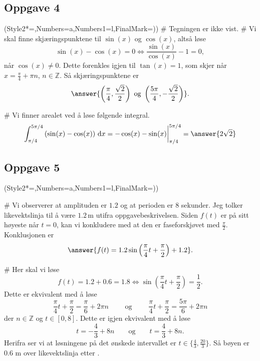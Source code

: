 \subsection*{Oppgave 4}

\begin{easylist}[enumerate]
\ListProperties(Style2*=,Numbers=a,Numbers1=l,FinalMark={)})
# Tegningen er ikke vist.
# Vi skal finne skjæringspunktene til $\sin(x)$ og $\cos(x)$, altså løse 
\begin{equation*}
	\sin(x)-\cos(x)=0 \Longleftrightarrow \frac{\sin(x)}{\cos(x)} - 1 = 0,
\end{equation*}
når $\cos(x)\neq 0$. Dette forenkles igjen til $\tan(x)=1$, som skjer når $x=\frac{\pi}{4} + \pi n$, $n \in \mathbb{Z}$. 
Så skjæringspunktene er
\begin{equation*}
	\answer{\left( \frac{\pi}{4}, \frac{\sqrt{2}}{2} \right) \text{ og } \left( \frac{5\pi}{4}, -\frac{\sqrt{2}}{{2}} \right)}.
\end{equation*}

# Vi finner arealet ved å løse følgende integral.
\begin{equation*}
	\int_{\pi/4}^{5\pi/4} \left(\sin(x) - \cos(x)\right) \, \text{d}x = -\cos(x)-\sin(x)\bigg\vert_{\pi/4}^{5\pi/4} = \answer{2\sqrt{2}}
\end{equation*}
\end{easylist}

\subsection*{Oppgave 5}
\begin{easylist}[enumerate]
\ListProperties(Style2*=,Numbers=a,Numbers1=l,FinalMark={)})
	
# Vi observerer at amplituden er $1.2$ og at perioden er $8$ sekunder. 
Jeg tolker likevektslinja til å være $1.2 \, \text{m}$ utifra oppgavebeskrivelsen. 
Siden $f(t)$ er på sitt høyeste når $t=0$, kan vi konkludere med at den er faseforskjøvet med $\frac{\pi}{2}$. 
Konklusjonen er 
\begin{equation*}
	\answer{f(t)=1.2\sin\left(\frac{\pi}{4}t + \frac{\pi}{2} \right) + 1.2}.
\end{equation*}


# Her skal vi løse 
\begin{equation*}
	f(t)=1.2+0.6=1.8 \Longleftrightarrow \sin\left(\frac\pi4 t + \frac\pi2 \right)=\frac12 .
\end{equation*}
Dette er ekvivalent med å løse 
\begin{equation*}
	\frac\pi4 t + \frac\pi2 = \frac\pi6 + 2\pi n \qquad \text{ og } \qquad \frac\pi4 t + \frac\pi2 = \frac{5\pi}{6} + 2\pi n
\end{equation*}
der $n \in \mathbb{Z}$ og $t \in [0,8]$. 
Dette er igjen ekvivalent med å løse 
\begin{equation*}
	t=-\frac{4}{3} + 8n \qquad \text{og} \qquad t=\frac43 + 8n.
\end{equation*}
Herifra ser vi at løsningene på det ønskede intervallet er $t\in\{\frac43, \frac{20}{3}\}$.
Så bøyen er 0.6 m over likevektslinja etter .
\end{easylist}


